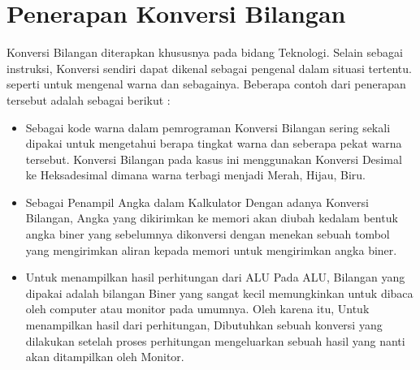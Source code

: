 \section{Penerapan Konversi Bilangan}
Konversi Bilangan diterapkan khususnya pada bidang Teknologi. Selain sebagai instruksi, Konversi sendiri dapat dikenal sebagai pengenal dalam situasi tertentu. seperti untuk mengenal warna dan sebagainya. Beberapa contoh dari penerapan tersebut adalah sebagai berikut : 
\begin{itemize}
\item Sebagai kode warna dalam pemrograman \break  Konversi Bilangan sering sekali dipakai untuk mengetahui berapa tingkat warna dan seberapa pekat warna tersebut. Konversi Bilangan pada kasus ini menggunakan Konversi Desimal ke Heksadesimal dimana warna terbagi menjadi Merah, Hijau, Biru. 
\item Sebagai Penampil Angka dalam Kalkulator \break  Dengan adanya Konversi Bilangan, Angka yang dikirimkan ke memori akan diubah kedalam bentuk angka biner yang sebelumnya dikonversi dengan menekan sebuah tombol yang mengirimkan aliran kepada memori untuk mengirimkan angka biner.
\item Untuk menampilkan hasil perhitungan dari ALU \break  Pada ALU, Bilangan yang dipakai adalah bilangan Biner yang sangat kecil memungkinkan untuk dibaca oleh computer atau monitor pada umumnya. Oleh karena itu, Untuk menampilkan hasil dari perhitungan, Dibutuhkan sebuah konversi yang dilakukan setelah proses perhitungan mengeluarkan sebuah hasil yang nanti akan ditampilkan oleh Monitor.
\end{itemize}

